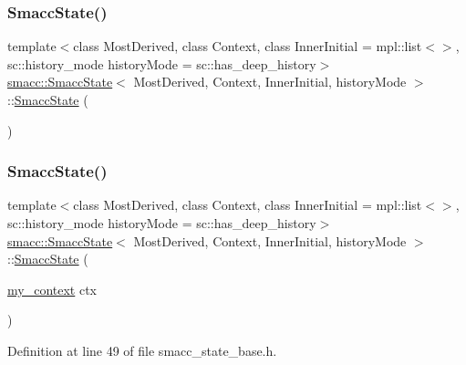 \subsubsection{\texorpdfstring{Smacc\+State()}{SmaccState()}\hspace{0.1cm}{\footnotesize\ttfamily [1/2]}}
{\footnotesize\ttfamily template$<$class Most\+Derived, class Context, class Inner\+Initial = mpl\+::list$<$$>$, sc\+::history\+\_\+mode history\+Mode = sc\+::has\+\_\+deep\+\_\+history$>$ \\
\hyperlink{classsmacc_1_1SmaccState}{smacc\+::\+Smacc\+State}$<$ Most\+Derived, Context, Inner\+Initial, history\+Mode $>$\+::\hyperlink{classsmacc_1_1SmaccState}{Smacc\+State} (\begin{DoxyParamCaption}{ }\end{DoxyParamCaption})\hspace{0.3cm}{\ttfamily [delete]}}

\mbox{\label{classsmacc_1_1SmaccState_adc225018fe91da47e6e9f1d20150b26a}} 
\subsubsection{\texorpdfstring{Smacc\+State()}{SmaccState()}\hspace{0.1cm}{\footnotesize\ttfamily [2/2]}}
{\footnotesize\ttfamily template$<$class Most\+Derived, class Context, class Inner\+Initial = mpl\+::list$<$$>$, sc\+::history\+\_\+mode history\+Mode = sc\+::has\+\_\+deep\+\_\+history$>$ \\
\hyperlink{classsmacc_1_1SmaccState}{smacc\+::\+Smacc\+State}$<$ Most\+Derived, Context, Inner\+Initial, history\+Mode $>$\+::\hyperlink{classsmacc_1_1SmaccState}{Smacc\+State} (\begin{DoxyParamCaption}\item[{\hyperlink{structsmacc_1_1SmaccState_1_1my__context}{my\+\_\+context}}]{ctx }\end{DoxyParamCaption})\hspace{0.3cm}{\ttfamily [inline]}}



Definition at line 49 of file smacc\+\_\+state\+\_\+base.\+h.


